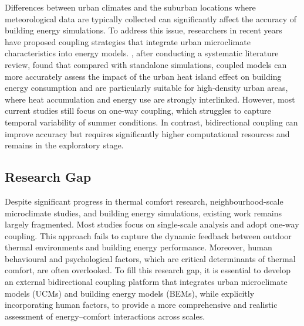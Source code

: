 Differences between urban climates and the suburban locations where meteorological data are typically collected can significantly affect the accuracy of building energy simulations. To address this issue, researchers in recent years have proposed coupling strategies that integrate urban microclimate characteristics into energy models. \citet{sezer2023urban}, after conducting a systematic literature review, found that compared with standalone simulations, coupled models can more accurately assess the impact of the urban heat island effect on building energy consumption and are particularly suitable for high-density urban areas, where heat accumulation and energy use are strongly interlinked. However, most current studies still focus on one-way coupling, which struggles to capture temporal variability of summer conditions. In contrast, bidirectional coupling can improve accuracy but requires significantly higher computational resources and remains in the exploratory stage.

\subsection{Research Gap}

Despite significant progress in thermal comfort research, neighbourhood-scale microclimate studies, and building energy simulations, existing work remains largely fragmented. Most studies focus on single-scale analysis and adopt one-way coupling. This approach fails to capture the dynamic feedback between outdoor thermal environments and building energy performance. Moreover, human behavioural and psychological factors, which are critical determinants of thermal comfort, are often overlooked. To fill this research gap, it is essential to develop an external bidirectional coupling platform that integrates urban microclimate models (UCMs) and building energy models (BEMs), while explicitly incorporating human factors, to provide a more comprehensive and realistic assessment of energy--comfort interactions across scales.
